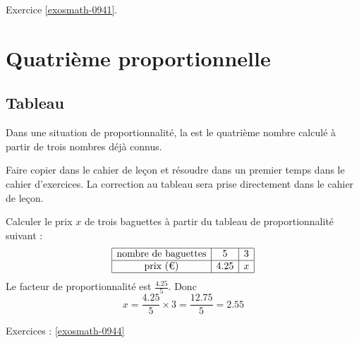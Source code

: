 Exercice \ref{exosmath-0941}.

\section{Quatrième proportionnelle}

\subsection{Tableau}

\begin{definition}
    Dans une situation de proportionnalité, la  est le quatrième nombre calculé à partir de trois nombres déjà connus.
\end{definition}

Faire copier dans le cahier de leçon et résoudre dans un premier temps dans le cahier d'exercices. La correction au tableau sera prise directement dans le cahier de leçon.

\begin{example}
    Calculer le prix \( x\) de trois baguettes à partir du tableau de proportionnalité suivant :
    \begin{equation*}
        \begin{array}[]{|c|c|c|}
            \hline
            \text{nombre de baguettes}&5&3\\
            \hline
            \text{prix (€)}&4.25&x\\
            \hline
        \end{array}
    \end{equation*}
    Le facteur de proportionnalité est \( \frac{ 4.25 }{ 5 }\). Donc
    \begin{equation}
        x=\frac{ 4.25 }{ 5 }\times 3=\frac{ 12.75 }{ 5 }=2.55
    \end{equation}
\end{example}

Exercices : \ref{exosmath-0944}

